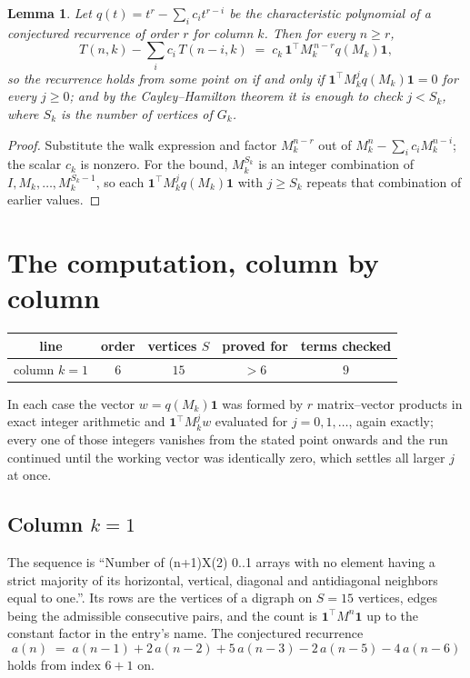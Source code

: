 \documentclass[11pt,a4paper]{article}
\theoremstyle{plain}
\newtheorem{lemma}[theorem]{Lemma}
\theoremstyle{definition}
\begin{document}
\begin{lemma}\label{lem:crit}
Let $q(t)=t^{r}-\sum_i c_it^{r-i}$ be the characteristic polynomial of a conjectured
recurrence of order $r$ for column $k$. Then for every $n\ge r$,
\[
T(n,k)-\sum_i c_i\,T(n-i,k)\;=\;c_k\,\mathbf{1}^{\!\top}M_k^{\,n-r}q(M_k)\mathbf{1},
\]
so the recurrence holds from some point on if and only if
$\mathbf{1}^{\!\top}M_k^{j}q(M_k)\mathbf{1}=0$ for every $j\ge0$; and by the
Cayley--Hamilton theorem it is enough to check $j<S_k$, where $S_k$ is the number of vertices
of $G_k$.
\end{lemma}

\begin{proof}
Substitute the walk expression and factor $M_k^{n-r}$ out of $M_k^{n}-\sum_ic_iM_k^{n-i}$;
the scalar $c_k$ is nonzero. For the bound, $M_k^{S_k}$ is an integer combination of
$I,M_k,\dots,M_k^{S_k-1}$, so each $\mathbf{1}^{\!\top}M_k^{j}q(M_k)\mathbf{1}$ with
$j\ge S_k$ repeats that combination of earlier values.
\end{proof}

\section{The computation, column by column}

\begin{center}
\begin{tabular}{ccccc}
line & order & vertices $S$ & proved for & terms checked \\ \hline
column $k$$=1$ & $6$ & $15$ & $>6$ & $9$ \\
\end{tabular}
\end{center}

In each case the vector $w=q(M_k)\mathbf{1}$ was formed by $r$ matrix--vector products in
exact integer arithmetic and $\mathbf{1}^{\!\top}M_k^{j}w$ evaluated for $j=0,1,\dots$,
again exactly; every one of those integers vanishes from the stated point onwards and the run
continued until the working vector was identically zero, which settles all larger $j$ at once.

\subsection*{Column $k$$=1$}
The sequence is ``Number of (n+1)X(2) 0..1 arrays with no element having a strict majority of its horizontal, vertical, diagonal and antidiagonal neighbors equal to one.''. Its rows are the vertices of a digraph on
$S=15$ vertices, edges being the admissible consecutive pairs, and the count is
$\mathbf{1}^{\!\top}M^{n}\mathbf{1}$ up to the constant factor in the entry's name.
The conjectured recurrence
\[
a(n)\;=\;a(n-1) + 2\,a(n-2) + 5\,a(n-3) - 2\,a(n-5) - 4\,a(n-6)
\]
holds from index $6+1$ on.
\end{document}
